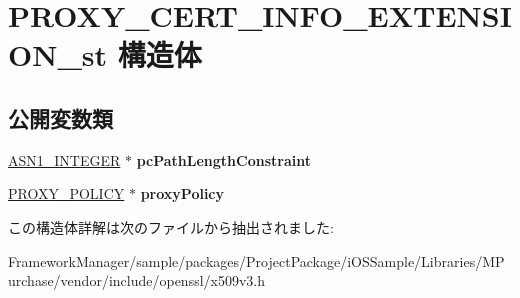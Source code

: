 \hypertarget{struct_p_r_o_x_y___c_e_r_t___i_n_f_o___e_x_t_e_n_s_i_o_n__st}{}\section{P\+R\+O\+X\+Y\+\_\+\+C\+E\+R\+T\+\_\+\+I\+N\+F\+O\+\_\+\+E\+X\+T\+E\+N\+S\+I\+O\+N\+\_\+st 構造体}
\label{struct_p_r_o_x_y___c_e_r_t___i_n_f_o___e_x_t_e_n_s_i_o_n__st}
\subsection*{公開変数類}
\begin{DoxyCompactItemize}
\item 
\hypertarget{struct_p_r_o_x_y___c_e_r_t___i_n_f_o___e_x_t_e_n_s_i_o_n__st_acf3159571e510bbbc386966004680934}{}\hyperlink{structasn1__string__st}{A\+S\+N1\+\_\+\+I\+N\+T\+E\+G\+E\+R} $\ast$ {\bfseries pc\+Path\+Length\+Constraint}\label{struct_p_r_o_x_y___c_e_r_t___i_n_f_o___e_x_t_e_n_s_i_o_n__st_acf3159571e510bbbc386966004680934}

\item 
\hypertarget{struct_p_r_o_x_y___c_e_r_t___i_n_f_o___e_x_t_e_n_s_i_o_n__st_a9e30dc35988c9cdca48712ac175ddbdb}{}\hyperlink{struct_p_r_o_x_y___p_o_l_i_c_y__st}{P\+R\+O\+X\+Y\+\_\+\+P\+O\+L\+I\+C\+Y} $\ast$ {\bfseries proxy\+Policy}\label{struct_p_r_o_x_y___c_e_r_t___i_n_f_o___e_x_t_e_n_s_i_o_n__st_a9e30dc35988c9cdca48712ac175ddbdb}

\end{DoxyCompactItemize}


この構造体詳解は次のファイルから抽出されました\+:\begin{DoxyCompactItemize}
\item 
Framework\+Manager/sample/packages/\+Project\+Package/i\+O\+S\+Sample/\+Libraries/\+M\+Purchase/vendor/include/openssl/x509v3.\+h\end{DoxyCompactItemize}
